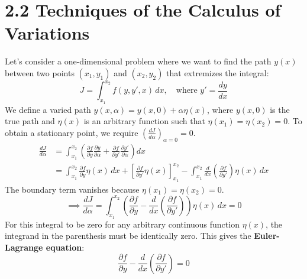 \documentclass[12pt]{article}
\begin{document}
	
	\section*{2.2 Techniques of the Calculus of Variations}
	Let's consider a one-dimensional problem where we want to find the path $y(x)$ between two points $(x_1, y_1)$ and $(x_2, y_2)$ that extremizes the integral:
	\begin{equation*}
		J = \int_{x_1}^{x_2} f(y, y', x) \, dx, \quad \text{where } y' = \frac{dy}{dx}
	\end{equation*}
	We define a varied path $y(x, \alpha) = y(x, 0) + \alpha \eta(x)$, where $y(x,0)$ is the true path and $\eta(x)$ is an arbitrary function such that $\eta(x_1) = \eta(x_2) = 0$.
	To obtain a stationary point, we require $\left( \frac{dJ}{d\alpha} \right)_{\alpha=0} = 0$.
	\begin{align*}
		\frac{dJ}{d\alpha} &= \int_{x_1}^{x_2} \left( \frac{\partial f}{\partial y} \frac{\partial y}{\partial \alpha} + \frac{\partial f}{\partial y'} \frac{\partial y'}{\partial \alpha} \right) dx \\
		&= \int_{x_1}^{x_2} \frac{\partial f}{\partial y} \eta(x) \, dx + \left[ \frac{\partial f}{\partial y'} \eta(x) \right]_{x_1}^{x_2} - \int_{x_1}^{x_2} \frac{d}{dx}\left(\frac{\partial f}{\partial y'}\right) \eta(x) \, dx
	\end{align*}
	The boundary term vanishes because $\eta(x_1)=\eta(x_2)=0$.
	\begin{equation*}
		\implies \frac{dJ}{d\alpha} = \int_{x_1}^{x_2} \left( \frac{\partial f}{\partial y} - \frac{d}{dx}\left(\frac{\partial f}{\partial y'}\right) \right) \eta(x) \, dx = 0
	\end{equation*}
	For this integral to be zero for any arbitrary continuous function $\eta(x)$, the integrand in the parenthesis must be identically zero. This gives the \textbf{Euler-Lagrange equation}:
	\begin{equation}
		\boxed{
			\frac{\partial f}{\partial y} - \frac{d}{dx}\left(\frac{\partial f}{\partial y'}\right) = 0
		}
	\end{equation}
	
	
\end{document}
